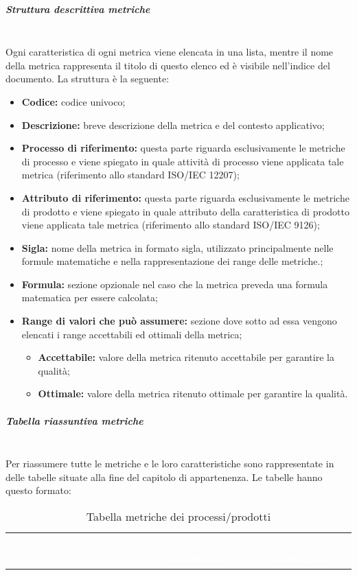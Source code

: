 \subparagraph{Struttura descrittiva metriche}\mbox{}\\
Ogni caratteristica di ogni metrica viene elencata in una lista, mentre il nome della metrica rappresenta il titolo di questo elenco ed è visibile nell'indice del documento. La struttura è la seguente:
\begin{itemize}
    \item \textbf{Codice:} codice univoco;
    \item \textbf{Descrizione:} breve descrizione della metrica e del contesto applicativo;
    \item \textbf{Processo di riferimento:} questa parte riguarda esclusivamente le metriche di processo e viene spiegato in quale attività di processo viene applicata tale metrica (riferimento allo standard ISO/IEC 12207);
    \item \textbf{Attributo di riferimento:} questa parte riguarda esclusivamente le metriche di prodotto e viene spiegato in quale attributo della caratteristica di prodotto viene applicata tale metrica (riferimento allo standard ISO/IEC 9126);
    \item \textbf{Sigla:} nome della metrica in formato sigla, utilizzato principalmente nelle formule matematiche e nella rappresentazione dei range delle metriche.;
    \item \textbf{Formula:} sezione opzionale nel caso che la metrica preveda una formula matematica per essere calcolata;
    \item \textbf{Range di valori che può assumere:} sezione dove sotto ad essa vengono elencati i range accettabili ed ottimali della metrica;
    \begin{itemize}
        \item \textbf{Accettabile:} valore della metrica ritenuto accettabile per garantire la qualità;
        \item \textbf{Ottimale:} valore della metrica ritenuto ottimale per garantire la qualità.
    \end{itemize}
\end{itemize} 

\subparagraph{Tabella riassuntiva metriche}\mbox{}\\
Per riassumere tutte le metriche e le loro caratteristiche sono rappresentate in delle tabelle situate alla fine del capitolo di appartenenza. Le tabelle hanno questo formato:

{
\renewcommand{\arraystretch}{1.5}
\begin{longtable}{ c C{4cm} c c c}
\caption{Tabella metriche dei processi/prodotti}\\
\textcolor{white}{\textbf{Metrica}} & \textcolor{white}{\textbf{Nome}} & \textcolor{white}{\textbf{Sigla}} & \textcolor{white}{\textbf{Valore Accettabile}} & \textcolor{white}{\textbf{Valore Ottimale}}\\
\end{longtable}
}

